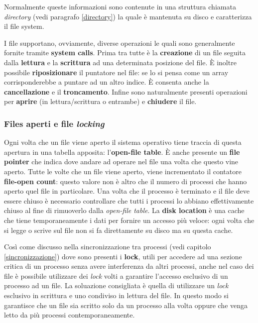 Normalmente queste informazioni sono contenute in una struttura chiamata \textit{directory} (vedi paragrafo \ref{directory}) la quale è mantenuta su disco e caratterizza il file system. 

I file supportano, ovviamente, diverse operazioni le quali sono generalmente fornite tramite \textbf{system calls}. Prima tra tutte è la \textbf{creazione} di un file seguita dalla \textbf{lettura} e la \textbf{scrittura} ad una determinata posizione del file. È inoltre possibile \textbf{riposizionare} il puntatore nel file: se lo si pensa come un array corrisponderebbe a puntare ad un altro indice. È consenta anche la \textbf{cancellazione} e il \textbf{troncamento}. Infine sono naturalmente presenti operazioni per \textbf{aprire} (in lettura/scrittura o entrambe) e \textbf{chiudere} il file.

% 
\subsubsection{Files aperti e file \textit{locking}}
Ogni volta che un file viene aperto il sistema operativo tiene traccia di questa apertura in una tabella apposita: l'\textbf{open-file table}. È anche presente un \textbf{file pointer} che indica dove andare ad operare nel file una volta che questo vine aperto. Tutte le volte che un file viene aperto, viene incrementato il contatore \textbf{file-open count}: questo valore non è altro che il numero di processi che hanno aperto quel file in particolare. Una volta che il processo è terminato e il file deve essere chiuso è necessario controllare che tutti i processi lo abbiano effettivamente chiuso al fine di rimuoverlo dalla \textit{open-file table}. La \textbf{disk location} è una cache che tiene temporaneamente i dati per fornire un accesso più veloce: ogni volta che si legge o scrive sul file non si fa direttamente su disco ma su questa cache.

Così come discusso nella sincronizzazione tra processi (vedi capitolo \ref{sincronizzazione}) dove sono presenti i \textbf{lock}, utili per accedere ad una sezione critica di un processo senza avere interferenza da altri processi, anche nel caso dei file è possibile utilizzare dei \textit{lock} volti a garantire l'accesso esclusivo di un processo ad un file. La soluazione consigliata è quella di utilizzare un \textit{lock} esclusivo in scrittura e uno condiviso in lettura del file. In questo modo si garantisce che un file sia scritto solo da un processo alla volta oppure che venga letto da più processi contemporaneamente.

